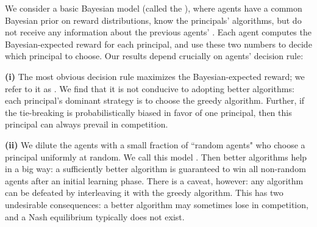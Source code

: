 

We consider a basic Bayesian model (called the \emph{\TheoryModel}), where agents have a common Bayesian prior on reward distributions, know the principals' algorithms, but do not receive any information about the previous agents' . Each agent computes the Bayesian-expected reward for each principal, and use these two numbers to decide which principal to choose.
Our results depend crucially on agents' decision rule:

\textbf{(i)} The most obvious decision rule maximizes the Bayesian-expected reward; we refer to it as \HardMax. We find that it is not conducive to adopting better algorithms: each principal's dominant strategy is to choose the greedy algorithm. Further,
if the tie-breaking is probabilistically biased in favor of one principal, then this principal can always prevail in competition.

\textbf{(ii)} We dilute the \HardMax agents with a small fraction of ``random agents" who choose a principal uniformly at random. We call this model \HardMaxRandom. Then better algorithms help in a big way: a sufficiently better algorithm is guaranteed to win all non-random agents after an initial learning phase. There is a caveat, however: any algorithm can be defeated by interleaving it with the greedy algorithm. This has two undesirable consequences: a better algorithm may sometimes lose in competition, and a Nash equilibrium typically does not exist.

